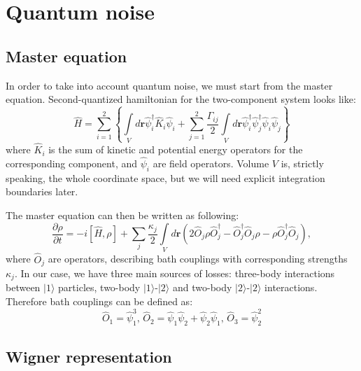 \documentclass[12pt,notitlepage]{report}
\begin{document}
\section*{Quantum noise}

\subsection*{Master equation}

In order to take into account quantum noise, we must start from the master equation.
Second-quantized hamiltonian for the two-component system looks like:
\[
\hat{H} = \sum\limits^2_{i=1} \left\{ \int\limits_V d\textbf{r} \hat{\psi}_i^\dagger \hat{K}_i \hat{\psi}_i +
\sum\limits^2_{j=1} \frac{\Gamma_{ij}}{2} \int\limits_V d\textbf{r} \hat{\psi}_i^\dagger \hat{\psi}_j^\dagger \hat{\psi}_i \hat{\psi}_j \right\}
\]
where $\hat{K}_i$ is the sum of kinetic and potential energy operators for the corresponding component,
and $\hat{\psi}_i$ are field operators.
Volume $V$ is, strictly speaking, the whole coordinate space, but we will need explicit integration boundaries later.

The master equation can then be written as following:
\[
\frac{\partial\rho}{\partial t} = -i [\hat{H}, \rho] + \sum\limits_j \frac{\kappa_j}{2} \int\limits_V d\textbf{r}
\left( 2  \hat{O}_j \rho \hat{O}_j^\dagger - \hat{O}_j^\dagger \hat{O}_j \rho - \rho \hat{O}_j^\dagger \hat{O}_j \right),
\]
where $\hat{O}_j$ are operators, describing bath couplings with corresponding strengths $\kappa_j$.
In our case, we have three main sources of losses: three-body interactions between $\vert1\rangle$ particles,
two-body $\vert1\rangle$-$\vert2\rangle$ and two-body $\vert2\rangle$-$\vert2\rangle$ interactions.
Therefore bath couplings can be defined as:
\begin{equation}
\label{bath_coupling_operators}
\hat{O}_1 = \hat{\psi}_1^3,\, \hat{O}_2 = \hat{\psi}_1 \hat{\psi}_2 + \hat{\psi}_2 \hat{\psi}_1,\, \hat{O}_3 = \hat{\psi}_2^2
\end{equation}

\subsection*{Wigner representation}
\end{document}
